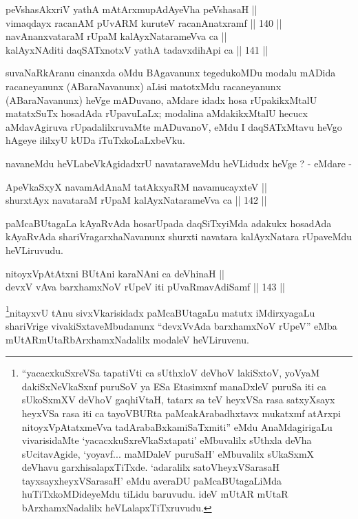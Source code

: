 
\begin{shl}
peVshasAkxriV yathA mAtArxmupAdAyeVha peVshasaH || \\
vimaqdayx racanAM pUvARM kuruteV racanAnatxramf \hfill || 140 ||  \\
navAnanxvataraM rUpaM kalAyxNatarameVva ca || \\
kalAyxNAditi daqSATxnotxV yathA tadavxdihApi ca \hfill || 141 ||  
\end{shl}

\begin{artha}
suvaNaRkAranu cinanxda oMdu BAgavanunx tegedukoMDu modalu mADida
racaneyanunx (ABaraNavanunx) aLisi matotxMdu racaneyanunx
(ABaraNavanunx) heVge mADuvano, aMdare idadx hosa rUpakikxMtalU
matatxSuTx hosadAda rUpavuLaLx; modalina aMdakikxMtalU hecucx
aMdavAgiruva rUpadalilxruvaMte mADuvanoV, eMdu I daqSATxMtavu heVgo
hAgeye ililxyU kUDa iTuTxkoLaLxbeVku.
\end{artha}

\begin{artha}
navaneMdu heVLabeVkAgidadxrU navataraveMdu heVLidudx heVge ? - eMdare -
\end{artha}

\begin{shl}
ApeVkaSxyX navamAdAnaM tatAkxyaRM navamucayxteV || \\
shurxtAyx navataraM rUpaM kalAyxNatarameVva ca \hfill || 142 ||  
\end{shl}

\begin{artha}
paMcaBUtagaLa kAyaRvAda hosarUpada daqSiTxyiMda adakukx hosadAda
kAyaRvAda shariVragarxhaNavanunx shurxti navatara kalAyxNatara
rUpaveMdu heVLiruvudu.
\end{artha}


\begin{shl}
nitoyxVpAtAtxni BUtAni karaNAni ca deVhinaH || \\
devxV vAva barxhamxNoV rUpeV iti pUvaRmavAdiSamf \hfill || 143 ||  
\end{shl}

\begin{artha}
\footnote{``yacacxkuSxreVSa tapatiVti ca sUthxloV deVhoV lakiSxtoV, yoV\s yaM dakiSxNeV\s kaSxnf puruSoV ya ESa Etasimxnf manaDxleV puruSa iti ca sUkoSxmXV deVhoV gaqhiVtaH, tatarx sa teV heyxVSa rasa satxyXsayx heyxVSa rasa iti ca tayoVBURta paMcakArabadhxtavx mukatxmf atArxpi nitoyxVpAtatxmeVva tadArabaBxkamiSaTxmiti'' eMdu AnaMdagirigaLu vivarisidaMte `yacacxkuSxreVkaSxtapati' eMbuvalilx sUthxla deVha sUcitavAgide, `yo\s yavf... maMDaleV
puruSaH' eMbuvalilx sUkaSxmX deVhavu garxhisalapxTiTxde. `adaralilx
satoVheyxVSarasaH tayxsayxheyxVSarasaH' eMdu averaDU
paMcaBUtagaLiMda huTiTxkoMDideyeMdu tiLidu baruvudu. ideV mUtAR
mUtaR bArxhamxNadalilx heVLalapxTiTxruvudu.}nitayxvU tAnu sivxVkarisidadx paMcaBUtagaLu matutx iMdirxyagaLu
shariVrige vivakiSxtaveMbudanunx ``devxVvAda barxhamxNoV rUpeV'' eMba
mUtARmUtaRbArxhamxNadalilx modaleV heVLiruvenu.
\end{artha}

